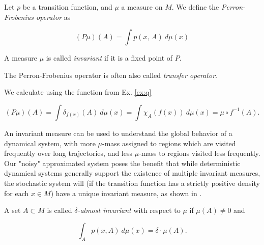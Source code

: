 \begin{definition}
    \cite*{attr} Let $p$ be a transition function, and $\mu$ a measure on $M$. 
    We define the \emph{Perron-Frobenius operator} as
    
    \begin{equation}
        (P\mu)(A) = \int p(x,\, A)\ d\mu (x)
    \end{equation}
    
    A measure $\mu$ is called \emph{invariant} if it is a fixed point of $P$.
\end{definition}

\begin{remark}
    The Perron-Frobenius operator is often also called \emph{transfer operator}.
\end{remark}

\begin{example} 
    \label{ex:pushforward}\cite*{attr} We calculate using the function from Ex. \ref{ex:q}

    \begin{equation}
        (P\mu)(A) = \int \delta_{f(x)} (A)\ d\mu (x) 
        = \int \chi_A (f(x))\ d\mu (x) = \mu \circ f^{-1}(A).
    \end{equation}

\end{example}

An invariant measure can be used to understand the global behavior of a dynamical 
system, with more $\mu$-mass assigned to regions which are visited frequently over long
trajectories, and less $\mu$-mass to regions visited less frequently. \\

Our "noisy" approximated system poses the benefit that while deterministic dynamical systems 
generally support the existence of multiple invariant measures, the stochastic system will 
(if the transition function has a strictly positive density for each $x \in M$) have a unique 
invariant measure, as shown in \cite*{lasota}. \\

\begin{definition}
    \cite*{attr}
    A set $A \subset M$ is called \emph{$\delta$-almost invariant} with respect to $\mu$ if 
    $\mu (A) \neq 0$ and 

    \begin{equation}
        \int_A p(x, A)\ d\mu (x) = \delta \cdot \mu (A). 
    \end{equation}

\end{definition}

